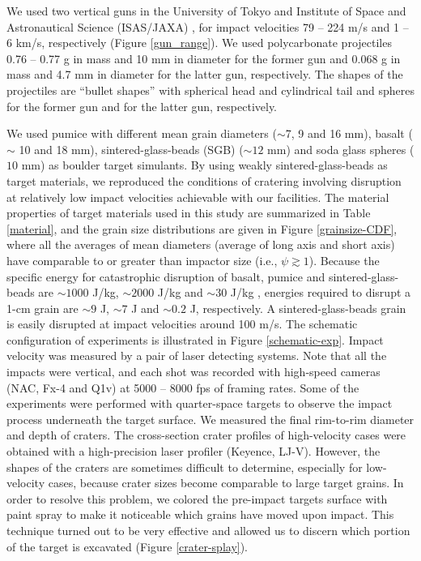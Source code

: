 \documentclass[3p,authoryear]{elsarticle}
\begin{document}

We used two vertical guns in the University of Tokyo and Institute of Space and Astronautical Science (ISAS/JAXA) , for impact velocities 79 -- 224 m/s and 1 -- 6 km/s, respectively (Figure \ref{gun_range}). We used polycarbonate projectiles 0.76 -- 0.77 g  in mass and 10 mm in diameter for the former gun and 0.068 g in mass and 4.7 mm in diameter for the latter gun, respectively.
The shapes of the projectiles are ``bullet shapes'' with spherical head and cylindrical tail and spheres for the former gun and for the latter gun, respectively.

We used pumice with different mean grain diameters ($\sim$7, 9 and 16 mm), basalt ($\sim$ 10 and 18 mm), sintered-glass-beads (SGB) ($\sim 12$ mm) and soda glass spheres ($10$ mm) as boulder target simulants.
By using weakly sintered-glass-beads \citep[e.g.][]{setoh2010} as target materials, we reproduced the conditions of cratering involving disruption at relatively low impact velocities achievable with our facilities.
 The material properties of target materials used in this study are summarized in Table \ref{material}, and the grain size distributions are given in Figure \ref{grainsize-CDF}, where all the averages of mean diameters (average of long axis and short axis) have comparable to or greater than impactor size (i.e., $\psi \gtrsim 1$).
Because the specific energy for catastrophic disruption of basalt, pumice and sintered-glass-beads are $\sim 1000$ J/kg, $\sim 2000$ J/kg and $\sim 30$ J/kg \citep{takagi1984,HH1999,setoh2010,patmore2014,flynn2015}, energies required to disrupt a 1-cm grain are $\sim 9$ J, $\sim 7$ J and $\sim 0.2$ J, respectively.
A sintered-glass-beads grain is easily disrupted at impact velocities around 100 m/s.
The schematic configuration of experiments is illustrated in Figure \ref{schematic-exp}. Impact velocity was measured by a pair of laser detecting systems.
 Note that all the impacts were vertical, and each shot was recorded with high-speed cameras (NAC, Fx-4 and Q1v) at 5000 -- 8000 fps of framing rates.
 Some of the experiments were performed with quarter-space targets to observe the impact process underneath the target surface.
We measured the final rim-to-rim diameter and depth of craters. The cross-section crater profiles of high-velocity cases were obtained with a high-precision laser profiler (Keyence, LJ-V).
However, the shapes of the craters are sometimes difficult to determine, especially for low-velocity cases, because crater sizes become comparable to large target grains.
In order to resolve this problem, we colored the pre-impact targets surface with paint spray to make it noticeable which grains have moved upon impact.
This technique turned out to be very effective and allowed us to discern which portion of the target is excavated (Figure \ref{crater-splay}).
\end{document}

